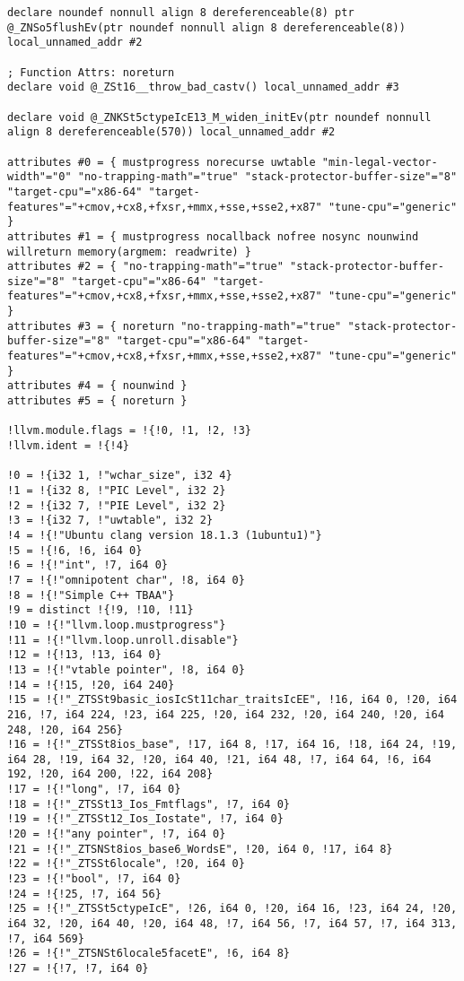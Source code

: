 \documentclass[UTF8,a4paper,10pt]{ctexart}
\begin{document}
\begin{lstlisting}[title=O1优化,frame=trbl]
declare noundef nonnull align 8 dereferenceable(8) ptr @_ZNSo5flushEv(ptr noundef nonnull align 8 dereferenceable(8)) local_unnamed_addr #2

; Function Attrs: noreturn
declare void @_ZSt16__throw_bad_castv() local_unnamed_addr #3

declare void @_ZNKSt5ctypeIcE13_M_widen_initEv(ptr noundef nonnull align 8 dereferenceable(570)) local_unnamed_addr #2

attributes #0 = { mustprogress norecurse uwtable "min-legal-vector-width"="0" "no-trapping-math"="true" "stack-protector-buffer-size"="8" "target-cpu"="x86-64" "target-features"="+cmov,+cx8,+fxsr,+mmx,+sse,+sse2,+x87" "tune-cpu"="generic" }
attributes #1 = { mustprogress nocallback nofree nosync nounwind willreturn memory(argmem: readwrite) }
attributes #2 = { "no-trapping-math"="true" "stack-protector-buffer-size"="8" "target-cpu"="x86-64" "target-features"="+cmov,+cx8,+fxsr,+mmx,+sse,+sse2,+x87" "tune-cpu"="generic" }
attributes #3 = { noreturn "no-trapping-math"="true" "stack-protector-buffer-size"="8" "target-cpu"="x86-64" "target-features"="+cmov,+cx8,+fxsr,+mmx,+sse,+sse2,+x87" "tune-cpu"="generic" }
attributes #4 = { nounwind }
attributes #5 = { noreturn }

!llvm.module.flags = !{!0, !1, !2, !3}
!llvm.ident = !{!4}

!0 = !{i32 1, !"wchar_size", i32 4}
!1 = !{i32 8, !"PIC Level", i32 2}
!2 = !{i32 7, !"PIE Level", i32 2}
!3 = !{i32 7, !"uwtable", i32 2}
!4 = !{!"Ubuntu clang version 18.1.3 (1ubuntu1)"}
!5 = !{!6, !6, i64 0}
!6 = !{!"int", !7, i64 0}
!7 = !{!"omnipotent char", !8, i64 0}
!8 = !{!"Simple C++ TBAA"}
!9 = distinct !{!9, !10, !11}
!10 = !{!"llvm.loop.mustprogress"}
!11 = !{!"llvm.loop.unroll.disable"}
!12 = !{!13, !13, i64 0}
!13 = !{!"vtable pointer", !8, i64 0}
!14 = !{!15, !20, i64 240}
!15 = !{!"_ZTSSt9basic_iosIcSt11char_traitsIcEE", !16, i64 0, !20, i64 216, !7, i64 224, !23, i64 225, !20, i64 232, !20, i64 240, !20, i64 248, !20, i64 256}
!16 = !{!"_ZTSSt8ios_base", !17, i64 8, !17, i64 16, !18, i64 24, !19, i64 28, !19, i64 32, !20, i64 40, !21, i64 48, !7, i64 64, !6, i64 192, !20, i64 200, !22, i64 208}
!17 = !{!"long", !7, i64 0}
!18 = !{!"_ZTSSt13_Ios_Fmtflags", !7, i64 0}
!19 = !{!"_ZTSSt12_Ios_Iostate", !7, i64 0}
!20 = !{!"any pointer", !7, i64 0}
!21 = !{!"_ZTSNSt8ios_base6_WordsE", !20, i64 0, !17, i64 8}
!22 = !{!"_ZTSSt6locale", !20, i64 0}
!23 = !{!"bool", !7, i64 0}
!24 = !{!25, !7, i64 56}
!25 = !{!"_ZTSSt5ctypeIcE", !26, i64 0, !20, i64 16, !23, i64 24, !20, i64 32, !20, i64 40, !20, i64 48, !7, i64 56, !7, i64 57, !7, i64 313, !7, i64 569}
!26 = !{!"_ZTSNSt6locale5facetE", !6, i64 8}
!27 = !{!7, !7, i64 0}

\end{lstlisting}
\end{document}
